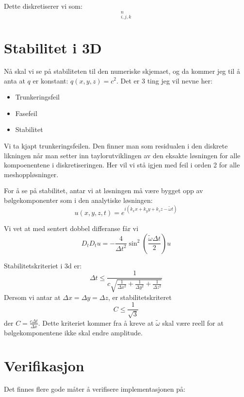 \documentclass[a4paper, 10pt]{article}
\begin{document}
Dette diskretiserer vi som:
\begin{equation}
	[D_t D_t u = D_xqD_x u + D_yqD_yu + D_zqD_zu]_{i, j, k}^n
\end{equation}

\section{Stabilitet i 3D}
Nå skal vi se på stabiliteten til den numeriske skjemaet, og da kommer jeg til å anta at $q$ er konstant: $q(x, y, z) = c^2$. 
Det er 3 ting jeg vil nevne her:
\begin{itemize}
\item Trunkeringsfeil
\item Fasefeil
\item Stabilitet
\end{itemize}

Vi ta kjapt trunkeringsfeilen. Den finner man som residualen i den diskrete likningen når man setter inn taylorutviklingen av den eksakte løsningen for alle kompoenentene i diskretiseringen. Her vil vi stå igjen med feil i orden 2 for alle meshoppløsninger. 

For å se på stabilitet, antar vi at løsningen må være bygget opp av bølgekomponenter som i den analytiske løsningen:
\begin{equation}
	u(x, y, z, t) = e^{i(k_x x + k_y y + k_z z - \tilde{\omega}t)}
\end{equation}

Vi vet at med sentert dobbel differanse får vi 
\begin{equation}
	D_tD_tu = -\frac{4}{\Delta t^2}\sin^2(\frac{\tilde{\omega}\Delta t}{2}) u
\end{equation}

Stabilitetskriteriet i 3d er:
\begin{equation}
	 \Delta t \leq \frac{1}{c \sqrt{ \frac{1}{\Delta x^2} + \frac{1}{\Delta y^2} + \frac{1}{\Delta z^2}}}
\end{equation}
Dersom vi antar at $\Delta x = \Delta y = \Delta z$, er stabilitetskriteret
\begin{equation}
	C \leq \frac{1}{\sqrt{3}}
\end{equation}
der $C = \frac{c \Delta t}{\Delta x}$. Dette kriteriet kommer fra å kreve at $\tilde{\omega}$ skal være reell for at bølgekomponentene ikke skal endre amplitude. 

\section{Verifikasjon}
Det finnes flere gode måter å verifisere implementasjonen på:
\end{document}
